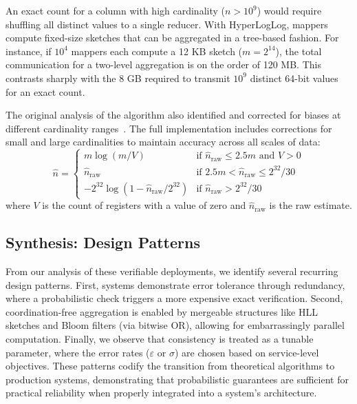 An exact count for a column with high cardinality ($n > 10^9$) would require shuffling all distinct values to a single reducer. With HyperLogLog, mappers compute fixed-size sketches that can be aggregated in a tree-based fashion. For instance, if $10^4$ mappers each compute a 12 KB sketch ($m = 2^{14}$), the total communication for a two-level aggregation is on the order of 120 MB. This contrasts sharply with the 8 GB required to transmit $10^9$ distinct 64-bit values for an exact count.

The original analysis of the algorithm also identified and corrected for biases at different cardinality ranges~\cite{flajolet2007hyperloglog}. The full implementation includes corrections for small and large cardinalities to maintain accuracy across all scales of data:
\begin{equation*}
    \hat{n} = \begin{cases}
        m \log(m/V)                                   & \text{if } \hat{n}_{\text{raw}} \leq 2.5m \text{ and } V > 0 \\
        \hat{n}_{\text{raw}}                          & \text{if } 2.5m < \hat{n}_{\text{raw}} \leq 2^{32}/30        \\
        -2^{32} \log(1 - \hat{n}_{\text{raw}}/2^{32}) & \text{if } \hat{n}_{\text{raw}} > 2^{32}/30
    \end{cases}
\end{equation*}
where $V$ is the count of registers with a value of zero and $\hat{n}_{\text{raw}}$ is the raw estimate.

\subsection{Synthesis: Design Patterns}

From our analysis of these verifiable deployments, we identify several recurring design patterns. First, systems demonstrate error tolerance through redundancy, where a probabilistic check triggers a more expensive exact verification. Second, coordination-free aggregation is enabled by mergeable structures like HLL sketches and Bloom filters (via bitwise OR), allowing for embarrassingly parallel computation. Finally, we observe that consistency is treated as a tunable parameter, where the error rates ($\varepsilon$ or $\sigma$) are chosen based on service-level objectives. These patterns codify the transition from theoretical algorithms to production systems, demonstrating that probabilistic guarantees are sufficient for practical reliability when properly integrated into a system's architecture.
